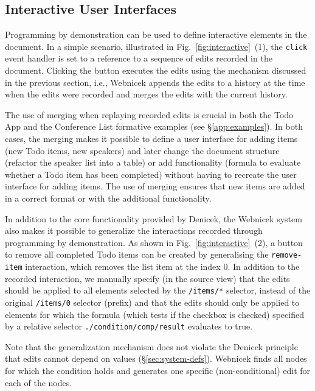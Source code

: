 \documentclass[sigconf,anonymous,screen]{acmart}
\begin{document}

\subsection{Interactive User Interfaces}
\label{sec:impl-interaction}

Programming by demonstration can be used to define interactive elements in the document. In a
simple scenario, illustrated in Fig.~\ref{fig:interactive}~(1), the {\small\Verb_click_} event
handler is set to a reference to a sequence of edits recorded in the document. Clicking the button
executes the edits using the mechanism discussed in the previous section, i.e., Webnicek appends
the edits to a history at the time when the edits were recorded and merges the edits with the
current history.

The use of merging when replaying recorded edits is crucial in both the Todo App and the Conference
List formative examples (see \S\ref{app:examples}). In both cases, the merging makes it possible to define
a user interface for adding items (new Todo items, new speakers) and later change the document
structure (refactor the speaker list into a table) or add functionality (formula to evaluate whether a
Todo item has been completed) without having to recreate the user interface for adding items.
The use of merging ensures that new items are added in a correct format or with the additional
functionality.

In addition to the core functionality provided by Denicek, the Webnicek system also makes it possible
to generalize the interactions recorded through programming by demonstration. As shown
in Fig.~\ref{fig:interactive}~(2), a button to remove all completed Todo items can be created by
generalising the {\small\Verb_remove-item_} interaction, which removes the list item at the index 0.
In addition to the recorded interaction, we manually specify (in the source view) that the edits
should be applied to all elements selected by the {\small\Verb_/items/*_} selector, instead of
the original {\small\Verb_/items/0_} selector (prefix) and that the edits should only be
applied to elements for which the formula (which tests if the checkbox is checked) specified by a
relative selector {\small\Verb_./condition/comp/result_} evaluates to true.

Note that the generalization mechanism does not violate the Denicek principle that edits cannot
depend on values (\S\ref{sec:system-defs}). Webnicek finds all nodes for which the condition
holds and generates one specific (non-conditional) edit for each of the nodes.
\end{document}
